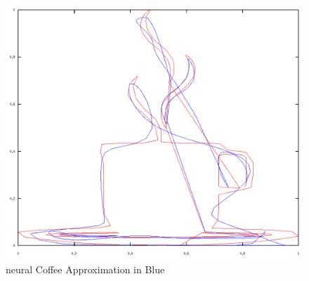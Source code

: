 \documentclass{article}
\begin{document}
\begin{figure}[tb]
	\begin{center}
		\includegraphics[scale=0.4]{img/coffee4}
	\end{center}
	\caption{neural Coffee Approximation in Blue}
	\label{fig:coffee4}
\end{figure}

\end{document}

